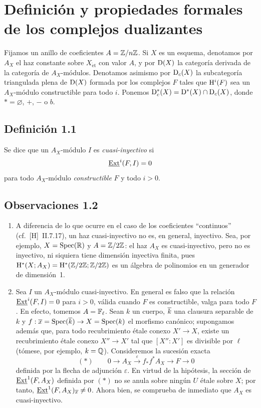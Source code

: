 \section{Definición y propiedades formales de los complejos dualizantes}

Fijamos un anillo de coeficientes $A = \mathbb{Z}/n\mathbb{Z}$. Si $X$ es un esquema, denotamos por $A_X$ el haz constante sobre $X_{\mathrm{\acute{e}t}}$ con valor $A$, y por $\mathrm{D}(X)$ la categoría derivada de la categoría de $A_X$-módulos. Denotamos asimismo por $\mathrm{D}_c(X)$ la subcategoría triangulada plena de $\mathrm{D}(X)$ formada por los complejos $F$ tales que $\mathrm{H}^i(F)$ sea un $A_X$-módulo constructible para todo $i$. Ponemos $\mathrm{D}_c^{*}(X) = \mathrm{D}^{*}(X) \cap \mathrm{D}_c(X)$, donde $* = \varnothing$, $+$, $-$ o $b$.

\subsection*{Definición 1.1}
Se dice que un $A_X$-módulo $I$ es \emph{cuasi-inyectivo} si
\[
\underline{\operatorname{Ext}}^i(F,I) = 0
\]
para todo $A_X$-módulo \emph{constructible} $F$ y todo $i > 0$.

\subsection*{Observaciones 1.2}
\begin{enumerate}[label=\alph*)]
\item A diferencia de lo que ocurre en el caso de los coeficientes ``continuos'' (cf.~[H]~II.7.17), un haz cuasi-inyectivo no es, en general, inyectivo. Sea, por ejemplo, $X = \operatorname{Spec}(\mathbb R)$ y $A = \mathbb{Z}/2\mathbb{Z}$: el haz $A_X$ es cuasi-inyectivo, pero no es inyectivo, ni siquiera tiene dimensión inyectiva finita, pues $\mathrm{H}^{*}(X; A_X) = \mathrm{H}^{*}(\mathbb{Z}/2\mathbb{Z}; \mathbb{Z}/2\mathbb{Z})$ es un álgebra de polinomios en un generador de dimensión~1.

\item Sea $I$ un $A_X$-módulo cuasi-inyectivo. En general es falso que la relación $\underline{\operatorname{Ext}}^i(F,I) = 0$ para $i > 0$, válida cuando $F$ es constructible, valga para todo $F$. En efecto, tomemos $A = \mathbb{F}_{\ell}$. Sean $k$ un cuerpo, $\overline{k}$ una clausura separable de $k$ y $f : \overline{x} = \operatorname{Spec}(\overline{k}) \to X = \operatorname{Spec}(k)$ el morfismo canónico; supongamos además que, para todo recubrimiento étale conexo $X' \to X$, existe un recubrimiento étale conexo $X'' \to X'$ tal que $[X'':X']$ es divisible por $\ell$ (tómese, por ejemplo, $k = \mathbb{Q}$). Consideremos la sucesión exacta
\[
(*) \qquad 0 \longrightarrow A_X \xrightarrow{\;\varepsilon\;} f_{*}f^{*}A_X \longrightarrow F \longrightarrow 0
\]
definida por la flecha de adjunción $\varepsilon$. En virtud de la hipótesis, la sección de $\underline{\operatorname{Ext}}^1(F,A_X)$ definida por $(*)$ no se anula sobre ningún $U$ étale sobre $X$; por tanto, $\underline{\operatorname{Ext}}^1(F,A_X)_{\overline{x}} \neq 0$. Ahora bien, se comprueba de inmediato que $A_X$ es cuasi-inyectivo.
\end{enumerate}

